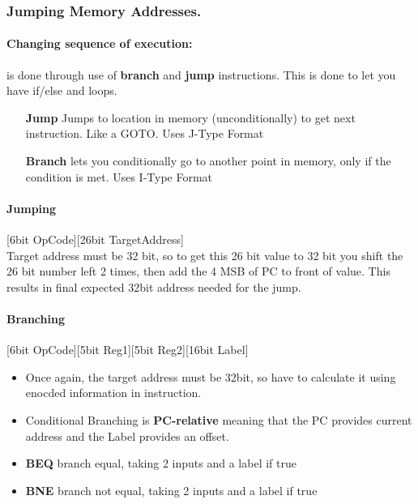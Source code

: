\documentclass{article}
\newcommand\tab[1][0.5cm]{\hspace*{#1}}
\begin{document}
		\subsubsection{Jumping Memory Addresses.}
			\paragraph{Changing sequence of execution: } is done through use of \textbf{branch} and \textbf{jump} instructions. This is done to let you have if/else and loops.
			\begin{enumerate}
				\item[\textbf{Jump}] Jumps to location in memory (unconditionally) to get next instruction. Like a GOTO. Uses J-Type Format
				\item[\textbf{Branch}] lets you conditionally go to another point in memory, only if the condition is met. Uses I-Type Format
			\end{enumerate}

			\paragraph{\tab Jumping} [6bit OpCode][26bit TargetAddress]\\ Target address must be 32 bit, so to get this 26 bit value to 32 bit you shift the 26 bit number left 2 times, then add the 4 MSB of PC to front of value. This results in final expected 32bit address needed for the jump.

			\paragraph{\tab Branching} [6bit OpCode][5bit Reg1][5bit Reg2][16bit Label]
			\begin{itemize}
				\item Once again, the target address must be 32bit, so have to calculate it using enocded information in instruction.
				\item Conditional Branching is \textbf{PC-relative} meaning that the PC provides current address and the Label provides an offset.
			\end{itemize}

			\begin{itemize}
				\item \textbf{BEQ} branch equal, taking 2 inputs and a label if true
				\item \textbf{BNE} branch not equal, taking 2 inputs and a label if true
			\end{itemize}
\end{document}
